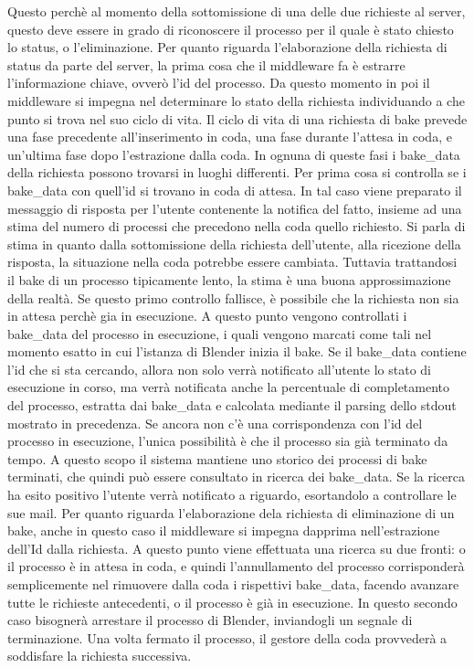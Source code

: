 Questo perchè al momento della sottomissione di una delle due richieste al server, questo deve essere in grado di riconoscere il processo per il quale è stato chiesto lo status, o l’eliminazione. 
Per quanto riguarda l’elaborazione della richiesta di status da parte del server, la prima cosa che il middleware fa è estrarre l’informazione chiave, ovverò l’id del processo. Da questo momento in poi il middleware si impegna nel determinare lo stato della richiesta individuando a che punto si trova nel suo ciclo di vita. 
Il ciclo di vita di una richiesta di bake prevede una fase precedente all’inserimento in coda, una fase durante l’attesa in coda, e un’ultima fase dopo l’estrazione dalla coda. In ognuna di queste fasi i bake\_data della richiesta possono trovarsi in luoghi differenti. Per prima cosa si controlla se i bake\_data con quell’id si trovano in coda di attesa. In tal caso viene preparato il messaggio di risposta per l’utente contenente la notifica del fatto, insieme ad una stima del numero di processi che precedono nella coda quello richiesto. Si parla di stima in quanto dalla sottomissione della richiesta dell’utente, alla ricezione della risposta, la situazione nella coda potrebbe essere cambiata. 
Tuttavia trattandosi il bake di un processo tipicamente lento, la stima è una buona approssimazione della realtà. 
Se questo primo controllo fallisce, è possibile che la richiesta non sia in attesa perchè gia in esecuzione. 
A questo punto vengono controllati i bake\_data del processo in esecuzione, i quali vengono marcati come tali nel momento esatto in cui l’istanza di Blender inizia il bake. 
Se il bake\_data contiene l’id che si sta cercando, allora non solo verrà notificato all’utente lo stato di esecuzione in corso, ma verrà notificata anche la percentuale di completamento del processo, estratta dai bake\_data e calcolata mediante il parsing dello stdout mostrato in precedenza. 
Se ancora non c’è una corrispondenza con l’id del processo in esecuzione, l’unica possibilità è che il processo sia già terminato da tempo. A questo scopo il sistema mantiene uno storico dei processi di bake terminati, che quindi può essere consultato in ricerca dei bake\_data. Se la ricerca ha esito positivo l’utente verrà notificato a riguardo, esortandolo a controllare le sue mail. 
Per quanto riguarda l’elaborazione dela richiesta di eliminazione di un bake, anche in questo caso il middleware si impegna dapprima nell’estrazione dell’Id dalla richiesta. A questo punto viene effettuata una ricerca su due fronti: o il processo è in attesa in coda, e quindi l’annullamento del processo corrisponderà semplicemente nel rimuovere dalla coda i rispettivi bake\_data, facendo avanzare tutte le richieste antecedenti, o il processo è già in esecuzione. In questo secondo caso bisognerà arrestare il processo di Blender, inviandogli un segnale di terminazione. 
Una volta fermato il processo, il gestore della coda provvederà a soddisfare la richiesta successiva.    
